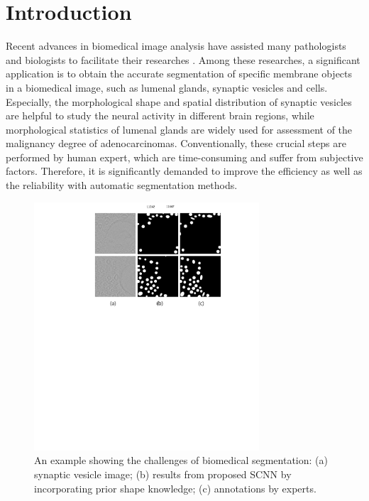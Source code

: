 \section{Introduction}
Recent advances in biomedical image analysis have assisted many pathologists and biologists to facilitate their researches \cite{Chen2016b, Ronneberger2015,Chen2016c,Lieman-Sifry2017,Paszke2016,Tseng2017,Sirinukunwattana2015b}.
Among these researches, a significant application is to obtain the accurate segmentation of specific membrane objects in a biomedical image, such as lumenal glands, synaptic vesicles and cells.
Especially, the morphological shape and spatial distribution of synaptic vesicles are helpful to study the neural activity in different brain regions, while morphological statistics of lumenal glands are widely used for assessment of the malignancy degree of adenocarcinomas.
%
Conventionally, these crucial steps are performed by human expert, which are time-consuming and suffer from subjective factors.
Therefore, it is significantly demanded to improve the efficiency as well as the reliability with automatic segmentation methods.

\begin{figure}
    \begin{center}
        \includegraphics[width=3.3in]{figures/FigImg.pdf}
    \end{center}
    \caption{An example showing the challenges of biomedical segmentation: (a) synaptic vesicle image; (b) results from proposed SCNN by incorporating prior shape knowledge; (c) annotations by experts.}
    \label{FigImgs}
\end{figure}

